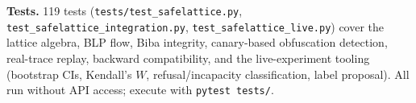 \documentclass[manuscript,screen,review,anonymous]{acmart}
\begin{document}
\textbf{Tests.} 119 tests (\texttt{tests/test\_safelattice.py}, \texttt{test\_safelattice\_integration.py}, \texttt{test\_safelattice\_live.py}) cover the lattice algebra, BLP flow, Biba integrity, canary-based obfuscation detection, real-trace replay, backward compatibility, and the live-experiment tooling (bootstrap CIs, Kendall's $W$, refusal/incapacity classification, label proposal). All run without API access; execute with \texttt{pytest tests/}.



\end{document}
